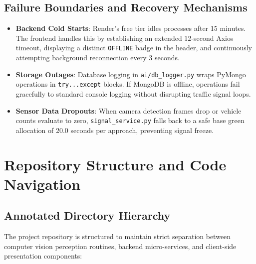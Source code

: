 \documentclass[11pt,a4paper,oneside]{report}
\begin{document}
\section{Failure Boundaries and Recovery Mechanisms}
\begin{itemize}[leftmargin=*]
    \item \textbf{Backend Cold Starts}: Render's free tier idles processes after 15 minutes. The frontend handles this by establishing an extended 12-second Axios timeout, displaying a distinct \texttt{OFFLINE} badge in the header, and continuously attempting background reconnection every 3 seconds.
    \item \textbf{Storage Outages}: Database logging in \texttt{ai/db\_logger.py} wraps PyMongo operations in \texttt{try...except} blocks. If MongoDB is offline, operations fail gracefully to standard console logging without disrupting traffic signal loops.
    \item \textbf{Sensor Data Dropouts}: When camera detection frames drop or vehicle counts evaluate to zero, \texttt{signal\_service.py} falls back to a safe base green allocation of 20.0 seconds per approach, preventing signal freeze.
\end{itemize}



\chapter{Repository Structure and Code Navigation}

\section{Annotated Directory Hierarchy}
The project repository is structured to maintain strict separation between computer vision perception routines, backend micro-services, and client-side presentation components:
\end{document}
